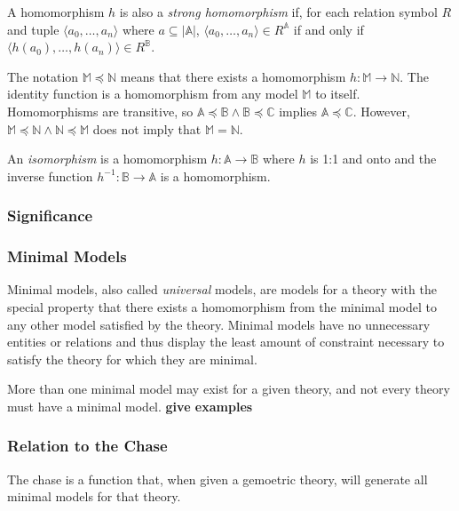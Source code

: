 		A homomorphism $h$ is also a \emph{strong homomorphism} if, for each
		relation symbol $R$ and tuple $\langle a_0 , \ldots , a_n \rangle$
		where $a \subseteq |\mathbb{A}|$, $\langle a_0 , \ldots , a_n  \rangle
		\in R^\mathbb{A}$ if and only if $\langle h(a_0) , \ldots , h(a_n)
		\rangle \in R^\mathbb{B}$.

		The notation $\mathbb{M} \preceq \mathbb{N}$ means that there exists a
		homomorphism $h : \mathbb{M} \to \mathbb{N}$. The identity function is
		a homomorphism from any model $\mathbb{M}$ to itself.  Homomorphisms
		are transitive, so $\mathbb{A} \preceq \mathbb{B} \wedge \mathbb{B}
		\preceq \mathbb{C}$ implies $\mathbb{A} \preceq \mathbb{C}$. However,
		$\mathbb{M} \preceq \mathbb{N} \wedge \mathbb{N} \preceq \mathbb{M}$
		does not imply that $\mathbb{M} = \mathbb{N}$.

		An \emph{isomorphism} is a homomorphism $h : \mathbb{A} \to \mathbb{B}$
		where $h$ is 1:1 and onto and the inverse function $h^{-1} : \mathbb{B}
		\to \mathbb{A}$ is a homomorphism.

		\subsubsection{Significance}

			

		\subsubsection{Minimal Models}

			Minimal models, also called \emph{universal} models, are models for a
			theory with the special property that there exists a homomorphism from
			the minimal model to any other model satisfied by the theory. Minimal
			models have no unnecessary entities or relations and thus display the
			least amount of constraint necessary to satisfy the theory for which
			they are minimal.

			More than one minimal model may exist for a given theory, and not every
			theory must have a minimal model. \textbf{give examples}

		\subsubsection{Relation to the Chase}

			The chase is a function that, when given a gemoetric theory, will
			generate all minimal models for that theory.
